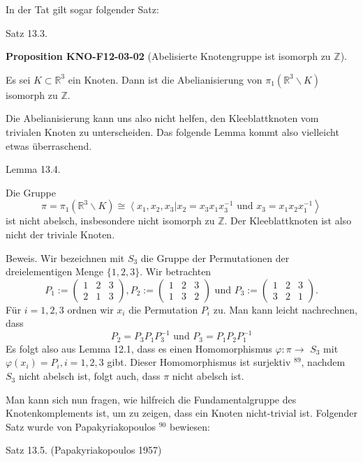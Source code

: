 \documentclass[10pt, letterpaper]{article}
\newcommand{\CustomHeading}[3]{%
  \par\medskip\noindent%
  \textbf{#1 #2} \textnormal{(#3)}.\enskip%
}
\newenvironment{PROP}[2]{\begin{unitbox}\CustomHeading{Proposition}{#1}{#2}}{\end{unitbox}}
\begin{document}
In der Tat gilt sogar folgender Satz:


Satz 13.3. 

\begin{PROP}{KNO-F12-03-02}{Abelisierte Knotengruppe ist isomorph zu $\mathbb{Z}$}
Es sei $K \subset \mathbb{R}^3$ ein Knoten. Dann ist die Abelianisierung von $\pi_1\left(\mathbb{R}^3 \backslash K\right)$ isomorph zu $\mathbb{Z}$.
\end{PROP}

Die Abelianisierung kann uns also nicht helfen, den Kleeblattknoten vom trivialen Knoten zu unterscheiden. Das folgende Lemma kommt also vielleicht etwas überraschend.

Lemma 13.4. 

Die Gruppe
$$
\left.\pi=\pi_1\left(\mathbb{R}^3 \backslash K\right) \cong\left\langle x_1, x_2, x_3\right| x_2=x_3 x_1 x_3^{-1} \text { und } x_3=x_1 x_2 x_1^{-1}\right\rangle
$$
ist nicht abelsch, insbesondere nicht isomorph zu $\mathbb{Z}$. Der Kleeblattknoten ist also nicht der triviale Knoten.

Beweis. Wir bezeichnen mit $S_3$ die Gruppe der Permutationen der dreielementigen Menge $\{1,2,3\}$. Wir betrachten
$$
P_1:=\left(\begin{array}{lll}
1 & 2 & 3 \\
2 & 1 & 3
\end{array}\right), P_2:=\left(\begin{array}{lll}
1 & 2 & 3 \\
1 & 3 & 2
\end{array}\right) \text { und } P_3:=\left(\begin{array}{lll}
1 & 2 & 3 \\
3 & 2 & 1
\end{array}\right) .
$$
Für $i=1,2,3$ ordnen wir $x_i$ die Permutation $P_i$ zu. Man kann leicht nachrechnen, dass
$$
P_2=P_3 P_1 P_3^{-1} \text { und } P_3=P_1 P_2 P_1^{-1}
$$
Es folgt also aus Lemma 12.1, dass es einen Homomorphismus $\varphi: \pi \rightarrow$ $S_3$ mit $\varphi\left(x_i\right)=P_i, i=1,2,3$ gibt. Dieser Homomorphismus ist surjektiv ${ }^{89}$, nachdem $S_3$ nicht abelsch ist, folgt auch, dass $\pi$ nicht abelsch ist.




Man kann sich nun fragen, wie hilfreich die Fundamentalgruppe des Knotenkomplements ist, um zu zeigen, dass ein Knoten nicht-trivial ist. Folgender Satz wurde von Papakyriakopoulos ${ }^{90}$ bewiesen:


Satz 13.5. (Papakyriakopoulos 1957) 
\end{document}
